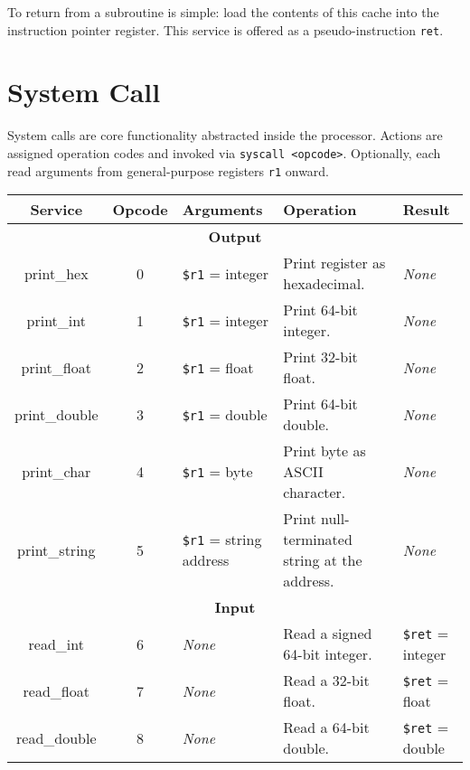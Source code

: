 \documentclass[10pt]{article}
\begin{document}
    To return from a subroutine is simple: load the contents of this cache into the instruction pointer register.
    This service is offered as a pseudo-instruction \texttt{ret}.

    \section{System Call}\label{sec:system-call}

    System calls are core functionality abstracted inside the processor.
    Actions are assigned operation codes and invoked via \texttt{syscall <opcode>}.
    Optionally, each read arguments from general-purpose registers \texttt{r1} onward.

    \bigskip
    \begin{longtable}{|c|c|l|l|l|}
        \hline
        \textbf{Service} & \textbf{Opcode} & \textbf{Arguments} & \textbf{Operation} & \textbf{Result} \\
        \hline
        \multicolumn{5}{|c|}{\textbf{Output}} \\
        \hline
        print\_hex & 0 & \texttt{\$r1} = integer & Print register as hexadecimal. & \textit{None} \\
        \hline
        print\_int & 1 & \texttt{\$r1} = integer & Print 64-bit integer. & \textit{None} \\
        \hline
        print\_float & 2 & \texttt{\$r1} = float & Print 32-bit float. & \textit{None} \\
        \hline
        print\_double & 3 & \texttt{\$r1} = double & Print 64-bit double. & \textit{None} \\
        \hline
        print\_char & 4 & \texttt{\$r1} = byte & Print byte as ASCII character. & \textit{None} \\
        \hline
        print\_string & 5 & \texttt{\$r1} = string address & Print null-terminated string at the address. & \textit{None} \\
        \hline \hline
        \multicolumn{5}{|c|}{\textbf{Input}} \\
        \hline
        read\_int & 6 & \textit{None} & Read a signed 64-bit integer. & \texttt{\$ret} = integer \\
        \hline
        read\_float & 7 & \textit{None} & Read a 32-bit float. & \texttt{\$ret} = float \\
        \hline
        read\_double & 8 & \textit{None} & Read a 64-bit double. & \texttt{\$ret} = double \\
        \hline

\end{longtable}
\end{document}
